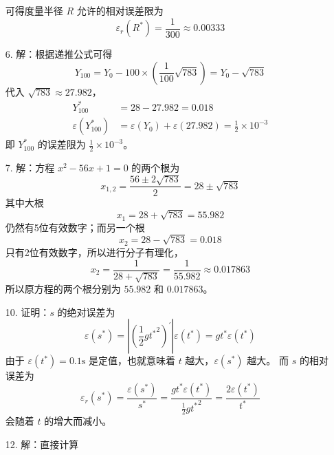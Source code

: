 \documentclass{sjtuarticle}
\begin{document}
\begin{itemize}
\begin{equation*}
    \end{equation*}
    可得度量半径 $R$ 允许的相对误差限为
    \begin{equation*}
        \varepsilon_r(R^*)=\frac{1}{300}\approx 0.00333
    \end{equation*}
    \item[6.] 解：根据递推公式可得
    \begin{equation*}
        Y_{100}=Y_0-100\times\left(\frac{1}{100}\sqrt{783}\right)=Y_0-\sqrt{783}
    \end{equation*}
    代入 $\sqrt{783}\approx 27.982$，
    \begin{align*}
        Y_{100}^*&=28-27.982=0.018\\
        \varepsilon(Y_{100}^*)&=\varepsilon(Y_0)+\varepsilon(27.982)=\frac{1}{2}\times 10^{-3}
    \end{align*}
    即 $Y_{100}^*$ 的误差限为 $\frac{1}{2}\times 10^{-3}$。
    \item[7.] 解：方程 $x^2-56x+1=0$ 的两个根为
    \begin{equation*}
        x_{1,2}=\frac{56\pm 2\sqrt{783}}{2}=28\pm \sqrt{783}
    \end{equation*}
    其中大根
    \begin{equation*}
        x_1=28+\sqrt{783}=55.982
    \end{equation*}
    仍然有5位有效数字；而另一个根
    \begin{equation*}
        x_2=28-\sqrt{783}=0.018
    \end{equation*}
    只有2位有效数字，所以进行分子有理化，
    \begin{equation*}
        x_2=\frac{1}{28+\sqrt{783}}=\frac{1}{55.982}\approx 0.017863
    \end{equation*}
    所以原方程的两个根分别为 $55.982$ 和 $0.017863$。
    \item[10.] 证明：$s$ 的绝对误差为
    \begin{equation*}
        \varepsilon(s^*)=\left|\left(\frac{1}{2}g{t^*}^2\right)^\prime\right|\varepsilon(t^*)=gt^*\varepsilon(t^*)
    \end{equation*}
    由于 $\varepsilon(t^*)=0.1\text{s}$ 是定值，也就意味着 $t$ 越大，$\varepsilon(s^*)$ 越大。
    而 $s$ 的相对误差为
    \begin{equation*}
        \varepsilon_r(s^*)=\frac{\varepsilon(s^*)}{s^*}=\frac{gt^*\varepsilon(t^*)}{\frac{1}{2}g{t^*}^2}=\frac{2\varepsilon(t^*)}{t^*}
    \end{equation*}
    会随着 $t$ 的增大而减小。
    \item[12.] 解：直接计算

\end{itemize}
\end{document}
